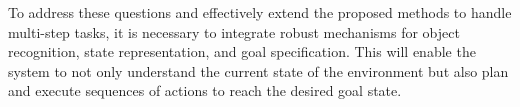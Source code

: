To address these questions and effectively extend the proposed methods to handle multi-step tasks, it is necessary to integrate robust mechanisms for object recognition, state representation, and goal specification. This will enable the system to not only understand the current state of the environment but also plan and execute sequences of actions to reach the desired goal state.
